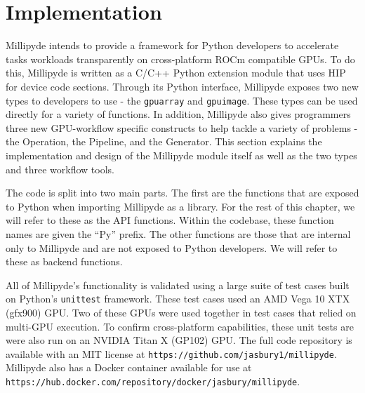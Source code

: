 

\chapter{Implementation}

Millipyde intends to provide a framework for Python developers to accelerate tasks workloads transparently on cross-platform ROCm compatible GPUs. To do this, Millipyde is written as a C/C++ Python extension module that uses HIP for device code sections. Through its Python interface, Millipyde exposes two new types to developers to use - the \verb|gpuarray| and \verb|gpuimage|. These types can be used directly for a variety of functions. In addition, Millipyde also gives programmers three new GPU-workflow specific constructs to help tackle a variety of problems - the Operation, the Pipeline, and the Generator. This section explains the implementation and design of the Millipyde module itself as well as the two types and three workflow tools.

\quad The code is split into two main parts. The first are the functions that are exposed to Python when importing Millipyde as a library. For the rest of this chapter, we will refer to these as the API functions. Within the codebase, these function names are given the ``Py'' prefix. The other functions are those that are internal only to Millipyde and are not exposed to Python developers. We will refer to these as backend functions.

\quad All of Millipyde's functionality is validated using a large suite of test cases built on Python's \verb|unittest| framework. These test cases used an AMD Vega 10 XTX (gfx900) GPU. Two of these GPUs were used together in test cases that relied on multi-GPU execution. To confirm cross-platform capabilities, these unit tests are were also run on an NVIDIA Titan X (GP102) GPU. The full code repository is available with an MIT license at \verb|https://github.com/jasbury1/millipyde|. Millipyde also has a Docker container available for use at \\ \verb|https://hub.docker.com/repository/docker/jasbury/millipyde|.

